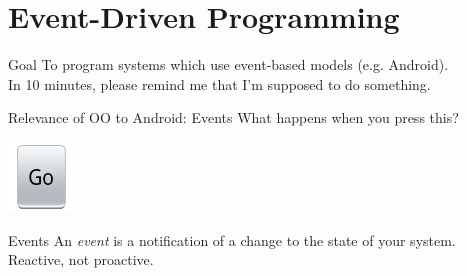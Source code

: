 \documentclass[aspectratio=169]{beamer}
\begin{document}
\section*{Event-Driven Programming}



\begin{frame}{Goal}
\Large
To program systems which use event-based models (e.g. Android). \\
\vspace{1em}
\pause
\small
In 10 minutes, please remind me that I'm supposed to do something.
\end{frame}



\begin{frame}{Relevance of OO to Android: Events}
What happens when you press this?
\begin{center}
\includegraphics{img/go-button}
\end{center}
\large {}
\end{frame}



\begin{frame}{Events}
\Large
An \emph{event} is a notification of a change to the state of your system. \\
\vspace{2em}
\pause
\Large Reactive, not proactive.
\end{frame}
\end{document}
